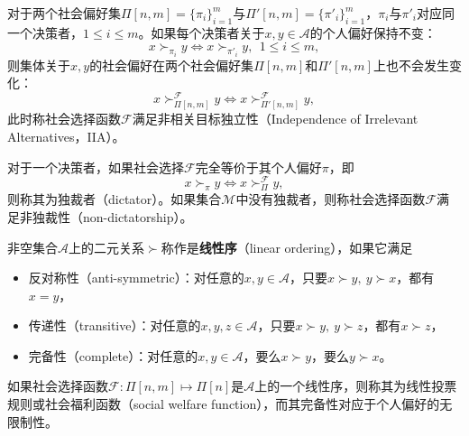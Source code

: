 \begin{definition}[非相关目标独立性]
对于两个社会偏好集$\Pi[n,m]=\{\pi_i\}_{i=1}^m$与$\Pi'[n,m]=\{\pi'_i\}_{i=1}^m$，$\pi_i$与$\pi'_i$对应同一个决策者，$1\le i \le m$。如果每个决策者关于$x,y\in \mathcal A$的个人偏好保持不变：
\begin{equation}
    x\succ_{\pi_i} y \Leftrightarrow x\succ_{\pi'_i} y,~~1\le i\le m,
\end{equation}
则集体关于$x,y$的社会偏好在两个社会偏好集$\Pi[n,m]$和$\Pi'[n,m]$上也不会发生变化：
\begin{equation}
    x\succ_{\Pi[n,m]}^{\mathcal F} y\Leftrightarrow x\succ_{\Pi'[n,m]}^{\mathcal F} y,
\end{equation}
此时称社会选择函数$\mathcal F$满足非相关目标独立性（Independence of Irrelevant Alternatives，IIA）。
\end{definition}

\begin{definition}[非独裁性]
对于一个决策者，如果社会选择$\mathcal F$完全等价于其个人偏好$\pi$，即
\begin{equation}
    x\succ_\pi y\Leftrightarrow x\succ_{\Pi}^{\mathcal F} y,
\end{equation}
则称其为独裁者（dictator）。如果集合$\mathcal M$中没有独裁者，则称社会选择函数$\mathcal F$满足非独裁性（non-dictatorship）。
\end{definition}

\begin{definition}[线性序]
非空集合$\mathcal A$上的二元关系$\succ$称作是\textbf{线性序}（linear ordering），如果它满足
\begin{itemize}
    \item 反对称性（anti-symmetric）：对任意的$x,y\in \mathcal A$，只要$x\succ y,~y\succ x$，都有$x=y$，
    \item 传递性（transitive）：对任意的$x,y,z\in \mathcal A$，只要$x\succ y,~y\succ z$，都有$x\succ z$，
    \item 完备性（complete）：对任意的$x,y\in \mathcal A$，要么$x\succ y$，要么$y\succ x$。
\end{itemize}
\end{definition}

\begin{definition}[社会福利函数]
如果社会选择函数$\mathcal F: \Pi[n,m]\mapsto \Pi[n]$是$\mathcal A$上的一个线性序，则称其为线性投票规则或社会福利函数（social welfare function），而其完备性对应于个人偏好的无限制性。
\end{definition}

